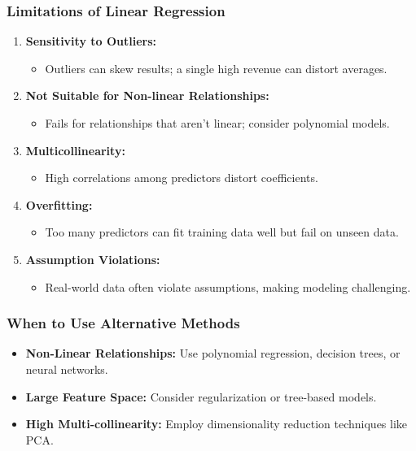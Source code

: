\documentclass[aspectratio=169]{beamer}
\begin{document}
\begin{frame}[fragile]
    \frametitle{Limitations of Linear Regression}
    \begin{enumerate}
        \item \textbf{Sensitivity to Outliers:}
        \begin{itemize}
            \item Outliers can skew results; a single high revenue can distort averages.
        \end{itemize}
        
        \item \textbf{Not Suitable for Non-linear Relationships:}
        \begin{itemize}
            \item Fails for relationships that aren't linear; consider polynomial models.
        \end{itemize}
        
        \item \textbf{Multicollinearity:}
        \begin{itemize}
            \item High correlations among predictors distort coefficients.
        \end{itemize}
        
        \item \textbf{Overfitting:}
        \begin{itemize}
            \item Too many predictors can fit training data well but fail on unseen data.
        \end{itemize}

        \item \textbf{Assumption Violations:}
        \begin{itemize}
            \item Real-world data often violate assumptions, making modeling challenging.
        \end{itemize}
    \end{enumerate}
\end{frame}

\begin{frame}[fragile]
    \frametitle{When to Use Alternative Methods}
    \begin{itemize}
        \item \textbf{Non-Linear Relationships:} Use polynomial regression, decision trees, or neural networks.
        \item \textbf{Large Feature Space:} Consider regularization or tree-based models.
        \item \textbf{High Multi-collinearity:} Employ dimensionality reduction techniques like PCA.
    \end{itemize}
\end{frame}
\end{document}

